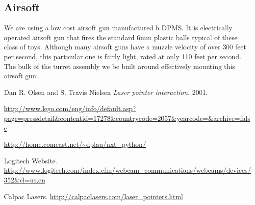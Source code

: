 \documentclass[10pt,twocolumn,letterpaper]{article}
\begin{document}
\subsection{Airsoft}
We are using a low cost airsoft gun manufactured b DPMS. It is electrically operated airsoft gun that fires the standard 6mm plastic balls typical of these class of toys. Although many airsoft guns have a muzzle velocity of over 300 feet per second, this particular one is fairly light, rated at only 110 feet per second. The bulk of the turret assembly we be built around effectively mounting this airsoft gun.
\begin{thebibliography}{1}

   Dan R. Olsen and S. Travis Nielsen {\em Laser pointer interaction.} 2001. 

   \url{http://www.lego.com/eng/info/default.asp?page=pressdetail&contentid=17278&countrycode=2057&yearcode=&archive=false}

   \url{http://home.comcast.net/~dplau/nxt\_python/}
  
	 Logitech Website. \url{http://www.logitech.com/index.cfm/webcam\_communications/webcams/devices/352&cl=us,en}

   Calpac Lasers. \url{http://calpaclasers.com/laser\_pointers.html}


  \end{thebibliography}
\end{document}
